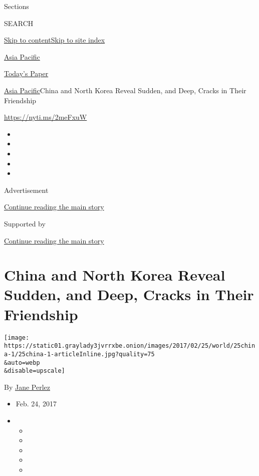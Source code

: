 Sections

SEARCH

\protect\hyperlink{site-content}{Skip to
content}\protect\hyperlink{site-index}{Skip to site index}

\href{https://www.nytimes3xbfgragh.onion/section/world/asia}{Asia
Pacific}

\href{https://myaccount.nytimes3xbfgragh.onion/auth/login?response_type=cookie\&client_id=vi}{}

\href{https://www.nytimes3xbfgragh.onion/section/todayspaper}{Today's
Paper}

\href{/section/world/asia}{Asia Pacific}\textbar{}China and North Korea
Reveal Sudden, and Deep, Cracks in Their Friendship

\url{https://nyti.ms/2meFxuW}

\begin{itemize}
\item
\item
\item
\item
\item
\end{itemize}

Advertisement

\protect\hyperlink{after-top}{Continue reading the main story}

Supported by

\protect\hyperlink{after-sponsor}{Continue reading the main story}

\hypertarget{china-and-north-korea-reveal-sudden-and-deep-cracks-in-their-friendship}{%
\section{China and North Korea Reveal Sudden, and Deep, Cracks in Their
Friendship}\label{china-and-north-korea-reveal-sudden-and-deep-cracks-in-their-friendship}}

\texttt{[image: https://static01.graylady3jvrrxbe.onion/images/2017/02/25/world/25china-1/25china-1-articleInline.jpg?quality=75\\\&auto=webp\\\&disable=upscale]}

By \href{http://www.nytimes3xbfgragh.onion/by/jane-perlez}{Jane Perlez}

\begin{itemize}
\item
  Feb. 24, 2017
\item
  \begin{itemize}
  \item
  \item
  \item
  \item
  \item
  \end{itemize}
\end{itemize}

